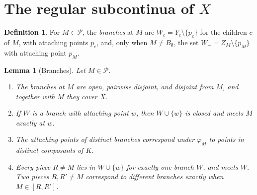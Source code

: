 \documentclass[11pt]{amsart}
\newtheorem{lemma}[theorem]{Lemma}
\theoremstyle{definition}
\newtheorem{definition}[theorem]{Definition}
\theoremstyle{remark}
\newcommand{\Pc}{\mathcal{P}}
\begin{document}
\section{\texorpdfstring{The regular subcontinua of $X$}{The regular subcontinua of X}}\label{sec:regular}

\begin{definition}\label{def:branches}
For $M\in\Pc$, the \emph{branches} at $M$ are $W_c=Y_c\setminus\{p_c\}$ for the children $c$ of $M$, with attaching points $p_c$, and, only when $M\neq B_\emptyset$, the set $W_-=Z_M\setminus\{p_M\}$ with attaching point $p_M$.
\end{definition}

\begin{lemma}[Branches]\label{lem:branches}
Let $M\in\Pc$.
\begin{enumerate}[label=\textup{(\alph*)}]
\item The branches at $M$ are open, pairwise disjoint, and disjoint from $M$, and together with $M$ they cover $X$.
\item If $W$ is a branch with attaching point $w$, then $W\cup\{w\}$ is closed and meets $M$ exactly at $w$.
\item The attaching points of distinct branches correspond under $\varphi_M$ to points in distinct composants of $K$.
\item Every piece $R\neq M$ lies in $W\cup\{w\}$ for exactly one branch $W$, and meets $W$. Two pieces $R,R'\neq M$ correspond to different branches exactly when $M\in[R,R']$.
\end{enumerate}
\end{lemma}
\end{document}
